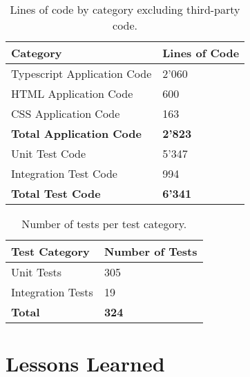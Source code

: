 \begin{table}[H]
    \begin{tabu}{X l}
        \toprule
        \textbf{Category}
        & \textbf{Lines of Code}\\
        \midrule

        Typescript Application Code
        & 2'060 \\

        HTML Application Code
        & 600 \\

        CSS Application Code
        & 163 \\
        \midrule
        \textbf{Total Application Code}
        & \textbf{2'823} \\
        \midrule

        Unit Test Code
        & 5'347 \\

        Integration Test Code
        & 994 \\

        \midrule
        \textbf{Total Test Code}
        & \textbf{6'341} \\
        \midrule

    \end{tabu}
    \caption{Lines of code by category excluding third-party code.}
    \label{tab:lines-of-code}
\end{table}

\begin{table}[H]
    \begin{tabu}{X l}
        \toprule
        \textbf{Test Category}
        & \textbf{Number of Tests}\\
        \midrule

        Unit Tests
        & 305 \\

        Integration Tests
        & 19 \\

        \midrule
        \textbf{Total}
        & \textbf{324} \\
        \midrule
    \end{tabu}
    \caption{Number of tests per test category.}
    \label{tab:lines-of-code}
\end{table}

\section{Lessons Learned}

